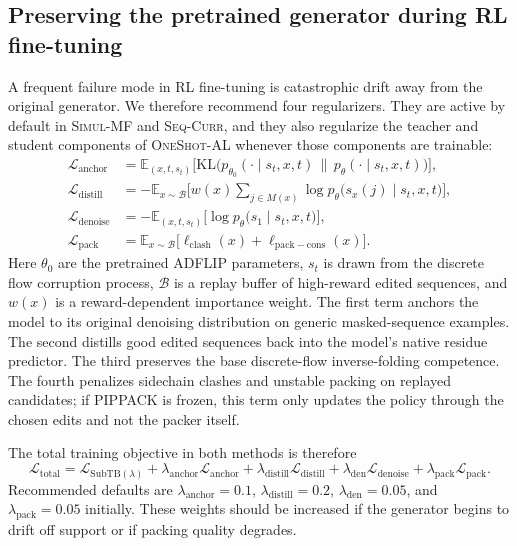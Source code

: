 \documentclass[11pt]{article}
\newcommand{\EE}{\mathbb{E}}
\newcommand{\KL}{\ensuremath{\mathrm{KL}}}
\newcommand{\SubTB}{\ensuremath{\mathrm{SubTB}}}
\newcommand{\methodI}{\textsc{Simul-MF}}
\newcommand{\methodII}{\textsc{Seq-Curr}}
\newcommand{\methodIII}{\textsc{OneShot-AL}}
\begin{document}
	\subsection{Preserving the pretrained generator during RL fine-tuning}
	
	A frequent failure mode in RL fine-tuning is catastrophic drift away from the original generator. We therefore recommend four regularizers. They are active by default in \methodI{} and \methodII{}, and they also regularize the teacher and student components of \methodIII{} whenever those components are trainable:
	\begin{align}
		\mathcal{L}_{\mathrm{anchor}} &= \EE_{(x,t,s_t)}\Big[\KL\big(p_{\theta_0}(\cdot\mid s_t,x,t)\,\|\,p_\theta(\cdot\mid s_t,x,t)\big)\Big],\\
		\mathcal{L}_{\mathrm{distill}} &= -\EE_{x\sim\mathcal{B}}\Big[w(x)\sum_{j\in M(x)}\log p_\theta\big(s_x(j)\mid s_t,x,t\big)\Big],\\
		\mathcal{L}_{\mathrm{denoise}} &= -\EE_{(x,t,s_t)}\Big[\log p_\theta\big(s_1\mid s_t,x,t\big)\Big],\\
		\mathcal{L}_{\mathrm{pack}} &= \EE_{x\sim\mathcal{B}}\Big[\ell_{\mathrm{clash}}(x)+\ell_{\mathrm{pack-cons}}(x)\Big].
	\end{align}
	Here $\theta_0$ are the pretrained ADFLIP parameters, $s_t$ is drawn from the discrete flow corruption process, $\mathcal{B}$ is a replay buffer of high-reward edited sequences, and $w(x)$ is a reward-dependent importance weight. The first term anchors the model to its original denoising distribution on generic masked-sequence examples. The second distills good edited sequences back into the model's native residue predictor. The third preserves the base discrete-flow inverse-folding competence. The fourth penalizes sidechain clashes and unstable packing on replayed candidates; if PIPPACK is frozen, this term only updates the policy through the chosen edits and not the packer itself.
	
	The total training objective in both methods is therefore
	\begin{equation}
		\label{eq:totalloss}
		\mathcal{L}_{\mathrm{total}}=\mathcal{L}_{\SubTB(\lambda)}+\lambda_{\mathrm{anchor}}\mathcal{L}_{\mathrm{anchor}}+\lambda_{\mathrm{distill}}\mathcal{L}_{\mathrm{distill}}+\lambda_{\mathrm{den}}\mathcal{L}_{\mathrm{denoise}}+\lambda_{\mathrm{pack}}\mathcal{L}_{\mathrm{pack}}.
	\end{equation}
	Recommended defaults are $\lambda_{\mathrm{anchor}}=0.1$, $\lambda_{\mathrm{distill}}=0.2$, $\lambda_{\mathrm{den}}=0.05$, and $\lambda_{\mathrm{pack}}=0.05$ initially. These weights should be increased if the generator begins to drift off support or if packing quality degrades.
	
\end{document}
